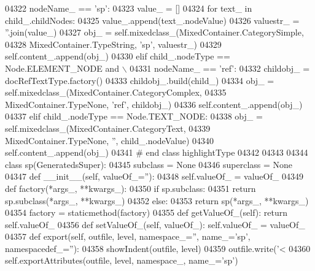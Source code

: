 \begin{DoxyCode}
{{{{{{{{{{{{{{{{{{{{{{{{{{{{{{{{{{{{{{{{{{{{{{{{{{{{{{{{{{{{{{{{{{{{{{{{{{{{{{{{{{{{{{{{{{{{{{{{{{{{{{{{{{{{{{{{{{{{{{{{{{{{{{{{{{{{{{{{{{{{{{{{{{{{{{{{{{{{{{{{{{{{{{{{{{{{{{{{{{{{{{{{{{{{{{{{{{{{{{{{{{{{{{{{{{{{{{{{{{{{{{{{{{{{{{{{{{{{{{{{{{{{{{{{{{{{{{{{{{{{{{{{{{{{{{{{{{{{{{{{{{04322             nodeName\_ == \textcolor{stringliteral}{'sp'}:
04323             value\_ = []
04324             \textcolor{keywordflow}{for} text\_ \textcolor{keywordflow}{in} child\_.childNodes:
04325                 value\_.append(text\_.nodeValue)
04326             valuestr\_ = \textcolor{stringliteral}{''}.join(value\_)
04327             obj\_ = self.mixedclass_(MixedContainer.CategorySimple,
04328                 MixedContainer.TypeString, \textcolor{stringliteral}{'sp'}, valuestr\_)
04329             self.content\_.append(obj\_)
04330         \textcolor{keywordflow}{elif} child\_.nodeType == Node.ELEMENT\_NODE \textcolor{keywordflow}{and} \(\backslash\)
04331             nodeName\_ == \textcolor{stringliteral}{'ref'}:
04332             childobj\_ = docRefTextType.factory()
04333             childobj\_.build(child\_)
04334             obj\_ = self.mixedclass_(MixedContainer.CategoryComplex,
04335                 MixedContainer.TypeNone, \textcolor{stringliteral}{'ref'}, childobj\_)
04336             self.content\_.append(obj\_)
04337         \textcolor{keywordflow}{elif} child\_.nodeType == Node.TEXT\_NODE:
04338             obj\_ = self.mixedclass_(MixedContainer.CategoryText,
04339                 MixedContainer.TypeNone, \textcolor{stringliteral}{''}, child\_.nodeValue)
04340             self.content\_.append(obj\_)
04341 \textcolor{comment}{# end class highlightType}
04342 
04343 
04344 \textcolor{keyword}{class }sp(GeneratedsSuper):
04345     subclass = \textcolor{keywordtype}{None}
04346     superclass = \textcolor{keywordtype}{None}
04347     \textcolor{keyword}{def }__init__(self, valueOf\_=''):
04348         self.valueOf_ = valueOf\_
04349     \textcolor{keyword}{def }factory(*args\_, **kwargs\_):
04350         \textcolor{keywordflow}{if} sp.subclass:
04351             \textcolor{keywordflow}{return} sp.subclass(*args\_, **kwargs\_)
04352         \textcolor{keywordflow}{else}:
04353             \textcolor{keywordflow}{return} sp(*args\_, **kwargs\_)
04354     factory = staticmethod(factory)
04355     \textcolor{keyword}{def }getValueOf_(self): \textcolor{keywordflow}{return} self.valueOf\_
04356     \textcolor{keyword}{def }setValueOf_(self, valueOf\_): self.valueOf\_ = valueOf\_
04357     \textcolor{keyword}{def }export(self, outfile, level, namespace\_='', name\_='sp', namespacedef\_=''):
04358         showIndent(outfile, level)
04359         outfile.write(\textcolor{stringliteral}{'<%
04360         self.exportAttributes(outfile, level, namespace\_, name\_=\textcolor{stringliteral}{'sp'})
}}}}}}}}}}}}}}}}}}}}}}}}}}}}}}}}}}}}}}}}}}}}}}}}}}}}}}}}}}}}}}}}}}}}}}}}}}}}}}}}}}}}}}}}}}}}}}}}}}}}}}}}}}}}}}}}}}}}}}}}}}}}}}}}}}}}}}}}}}}}}}}}}}}}}}}}}}}}}}}}}}}}}}}}}}}}}}}}}}}}}}}}}}}}}}}}}}}}}}}}}}}}}}}}}}}}}}}}}}}}}}}}}}}}}}}}}}}}}}}}}}}}}}}}}}}}}}}}}}}}}}}}}}}}}}}}}}}}}}}}}}}
\end{DoxyCode}
